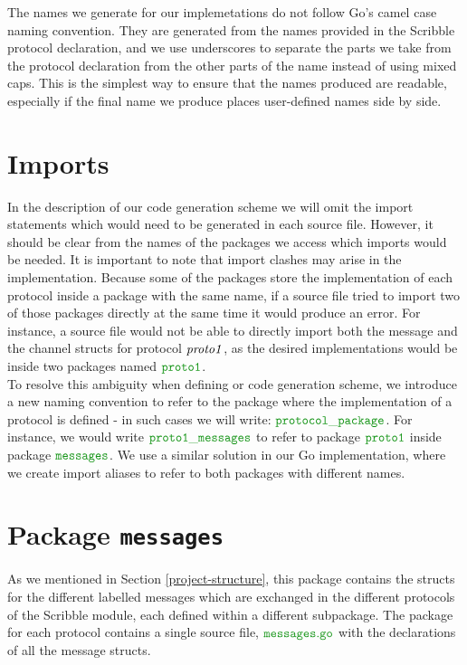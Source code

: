 \documentclass[12pt,twoside]{report}
\begin{document}
The names we generate for our implemetations do not follow Go's camel case naming convention. They are generated from the names provided in the Scribble protocol declaration, and we use underscores to separate the parts we take from the protocol declaration from the other parts of the name instead of using mixed caps. This is the simplest way to ensure that the names produced are readable, especially if the final name we produce places user-defined names side by side.


\section{Imports}
In the description of our code generation scheme we will omit the import statements which would need to be generated in each source file. However, it should be clear from the names of the packages we access which imports would be needed. It is important to note that import clashes may arise in the implementation. Because some of the packages store the implementation of each protocol inside a package with the same name, if a source file tried to import two of those packages directly at the same time it would produce an error. For instance, a source file would not be able to directly import both the message and the channel structs for protocol ${\mathit{proto1}}$, as the desired implementations would be inside two packages named $\pkgname{proto1}$.\\

To resolve this ambiguity when defining or code generation scheme, we introduce a new naming convention to refer to the package where the implementation of a protocol is defined - in such cases we will write: $\pkgname{protocol\_package}$. For instance, we would write $\pkgname{proto1\_messages}$ to refer to package $\pkgname{proto1}$ inside package $\pkgname{messages}$. We use a similar solution in our Go implementation, where we create import aliases to refer to both packages with different names.\\


\section{Package \texttt{messages}}
As we mentioned in Section \ref{project-structure}, 
this package contains the structs for the different labelled messages which are exchanged in the different protocols of the Scribble module, each defined within a different subpackage. The package for each protocol contains a single source file, $\filename{messages}$ with the declarations of all the message structs.\\
\end{document}
